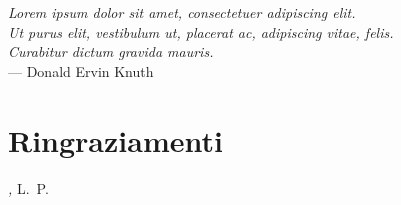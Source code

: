 
\cleardoublepage
{}
{}

\begin{flushright}{\slshape    
	Lorem ipsum dolor sit amet, consectetuer adipiscing elit. \\
	Ut purus elit, vestibulum ut, placerat ac, adipiscing vitae, felis. \\
	Curabitur dictum gravida mauris.} \\ \medskip
    --- Donald Ervin Knuth
\end{flushright}


\bigskip

\begingroup
\let\clearpage\relax
\let\cleardoublepage\relax
\let\cleardoublepage\relax

\chapter*{Ringraziamenti}

\lipsum[1]

\bigskip
 
\noindent\textit{\myLocation, \myTime}
\hfill L.~P.

\endgroup

